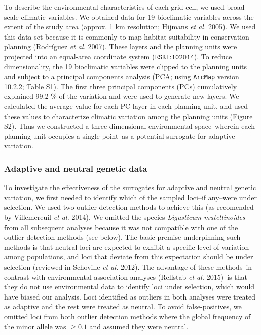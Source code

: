 \documentclass[11pt,]{article}
\begin{document}
To describe the environmental characteristics of each grid cell, we used
broad-scale climatic variables. We obtained data for 19 bioclimatic
variables across the extent of the study area (approx. 1 km resolution;
Hijmans \emph{et al.} 2005). We used this data set because it is
commonly to map habitat suitability in conservation planning (Rodríguez
\emph{et al.} 2007). These layers and the planning units were projected
into an equal-area coordinate system (\(\texttt{ESRI:102014}\)). To
reduce dimensionality, the 19 bioclimatic variables were clipped to the
planning units and subject to a principal components analysis (PCA;
using \texttt{ArcMap} version 10.2.2; Table S1). The first three
principal components (PCs) cumulatively explained 99.2 \% of the
variation and were used to generate new layers. We calculated the
average value for each PC layer in each planning unit, and used these
values to characterize climatic variation among the planning units
(Figure S2). Thus we constructed a three-dimensional environmental
space--wherein each planning unit occupies a single point--as a
potential surrogate for adaptive variation.

\subsubsection{Adaptive and neutral genetic
data}\label{adaptive-and-neutral-genetic-data}

To investigate the effectiveness of the surrogates for adaptive and
neutral genetic variation, we first needed to identify which of the
sampled loci--if any--were under selection. We used two outlier
detection methods to achieve this (as recomended by Villemereuil
\emph{et al.} 2014). We omitted the species
\textit{Ligusticum mutellinoides} from all subsequent analyses because
it was not compatible with one of the outlier detection methods (see
below). The basic premise underpinning such methods is that neutral loci
are expected to exhibit a specific level of variation among populations,
and loci that deviate from this expectation should be under selection
(reviewed in Schoville \emph{et al.} 2012). The advantage of these
methods--in contrast with environmental association analyses (Rellstab
\emph{et al.} 2015)--is that they do not use environmental data to
identify loci under selection, which would have biased our analysis.
Loci identified as outliers in both analyses were treated as adaptive
and the rest were treated as neutral. To avoid false-positives, we
omitted loci from both outlier detection methods where the global
frequency of the minor allele was \(\geq 0.1\) and assumed they were
neutral.
\end{document}
